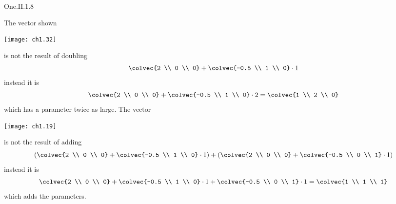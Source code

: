 \begin{ans}{One.II.1.8}
      \begin{exparts}
        \partsitem The vector shown
          \begin{center}
            \texttt{[image: ch1.32]}
          \end{center}
          is not the result of doubling
          \begin{equation*}
            \colvec{2 \\ 0 \\ 0}
              +\colvec{-0.5 \\ 1 \\ 0}\cdot 1
          \end{equation*}
          instead it is
          \begin{equation*}
            \colvec{2 \\ 0 \\ 0}
              +\colvec{-0.5 \\ 1 \\ 0}\cdot 2
            =\colvec{1 \\ 2 \\ 0}
          \end{equation*}
          which has a parameter twice as large.
        \partsitem The vector
          \begin{center}
            \texttt{[image: ch1.19]}
          \end{center}
          is not the result of adding
          \begin{equation*}
            (\colvec{2 \\ 0 \\ 0}
              +\colvec{-0.5 \\ 1 \\ 0}\cdot 1)
            +
            (\colvec{2 \\ 0 \\ 0}
              +\colvec{-0.5 \\ 0 \\ 1}\cdot 1)
          \end{equation*}
          instead it is
          \begin{equation*}
            \colvec{2 \\ 0 \\ 0}
              +\colvec{-0.5 \\ 1 \\ 0}\cdot 1
              +\colvec{-0.5 \\ 0 \\ 1}\cdot 1
            =\colvec{1 \\ 1 \\ 1}
          \end{equation*}
          which adds the parameters.
      \end{exparts}
    
\end{ans}

